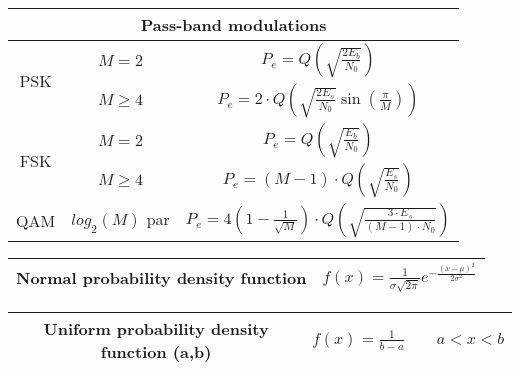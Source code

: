 \documentclass[en]{article}
\begin{document}
\begin{center}
    \renewcommand{\arraystretch}{2.2}
        \begin{tabular}{|c|c|c|}
            \multicolumn{3}{c}{{\bf Pass-band modulations}}\\
            \hline
            \multirow{2}{*}{PSK} & $M=2$ & $P_e = Q\left ( \sqrt{\displaystyle\frac{2 E_b}{N_0}} \right)$ \\
            \cline{2-3}
            & $M \geq 4$ & $P_e = 2 \cdot Q\left ( \sqrt{\displaystyle\frac{2 E_s}{N_0}} \sin\left ( \displaystyle\frac{\pi}{M} \right)  \right)$ \\
            \hline
            \multirow{2}{*}{FSK} & $M=2$ & $P_e = Q\left ( \sqrt{\displaystyle\frac{E_b}{N_0}} \right)$ \\
            \cline{2-3}
            & $M\geq 4$ & $P_e = (M-1) \cdot Q\left ( \sqrt{\displaystyle\frac{E_s}{N_0}} \right)$ \\
            \hline
            QAM & $log_2(M)$ par & $P_e = 4 \left ( 1 - \displaystyle\frac{1}{\sqrt{M}} \right ) \cdot Q\left ( \sqrt{\displaystyle\frac{3 \cdot E_s}{(M-1) \cdot N_0}} \right)$ \\
            \hline
        \end{tabular}
        \renewcommand{\arraystretch}{1}
        \vspace{0.5cm}

    \renewcommand{\arraystretch}{2}
        \begin{tabular}{|c|c|}
            \hline 
            Normal probability density function & $f(x) = \displaystyle\frac{1}{\sigma \sqrt{2 \pi}} e^{- \displaystyle\frac{(x - \mu)^2}{2 \sigma^2}}$ \\
            \hline
        \end{tabular}
    \renewcommand{\arraystretch}{1}
    \vspace{0.5cm}
    
    \renewcommand{\arraystretch}{2}
        \begin{tabular}{|c|c|}
            \hline 
            Uniform probability density function (a,b) & $f(x) = \frac{1}{b-a} \qquad a < x < b$ \\
            \hline
        \end{tabular}
    \renewcommand{\arraystretch}{1}
    \vspace{0.5cm}


\end{center}
\end{document}
